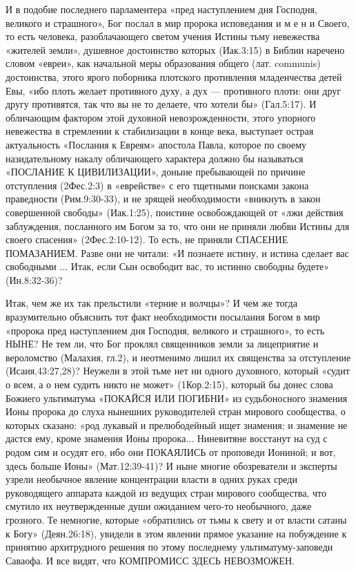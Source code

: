      И в подобие последнего парламентера «пред наступлением дня Господня, великого и страшного», Бог послал в мир пророка исповедания  и м е н и  Своего, то есть человека, разоблачающего светом учения Истины тьму невежества «жителей земли», душевное достоинство которых (Иак.3:15) в Библии наречено словом «евреи», как начальной меры образования общего (лат. communis) достоинства, этого ярого поборника плотского противления младенчества детей Евы, «ибо плоть желает противного духу, а дух --- противного плоти: они друг другу противятся, так что вы не то делаете, что хотели бы» (Гал.5:17).
И обличающим фактором этой духовной невозрожденности, этого упорного невежества в стремлении к стабилизации в конце века, выступает острая актуальность «Послания к Евреям» апостола Павла, которое по своему назидательному накалу обличающего характера должно бы называться «ПОСЛАНИЕ К ЦИВИЛИЗАЦИИ», доныне пребывающей по причине отступления (2Фес.2:3) в «еврействе» с его тщетными поисками закона праведности (Рим.9:30-33), и не зрящей необходимости «вникнуть в закон совершенной свободы» (Иак.1:25), поистине освобождающей от «лжи действия заблуждения, посланного им Богом за то, что они не приняли любви Истины для своего спасения» (2Фес.2:10-12). То есть, не приняли  СПАСЕНИЕ  ПОМАЗАНИЕМ. Разве они не читали: «И познаете истину, и истина сделает вас свободными ... Итак, если Сын освободит вас, то истинно свободны будете» (Ин.8:32-36)?

      Итак, чем же их так прельстили «терние и волчцы»?
      И чем же тогда вразумительно объяснить тот факт необходимости посылания Богом в мир «пророка пред наступлением дня Господня, великого и страшного», то есть НЫНЕ? Не тем ли, что Бог проклял священников земли за лицеприятие и вероломство (Малахия, гл.2), и неотменимо лишил их священства за отступление (Исаия,43:27,28)?     Неужели в этой тьме нет ни одного духовного, который «судит о всем, а о нем судить никто не может» (1Кор.2:15), который бы донес слова Божиего ультиматума  «ПОКАЙСЯ  ИЛИ  ПОГИБНИ»  из судьбоносного знамения Ионы пророка до слуха нынешних руководителей стран мирового сообщества, о которых сказано: «род лукавый и прелюбодейный ищет знамения; и знамение не дастся ему, кроме знамения Ионы пророка... Ниневитяне восстанут на суд с родом сим и осудят его, ибо они  ПОКАЯЛИСЬ  от проповеди Иониной; и вот, здесь больше Ионы» (Мат.12:39-41)?
     И ныне многие обозреватели и эксперты узрели необычное явление концентрации власти в одних руках среди руководящего аппарата каждой из ведущих стран мирового сообщества, что смутило их неутвержденные души ожиданием чего-то необычного, даже грозного. Те немногие, которые «обратились от тьмы к свету и от власти сатаны к Богу» (Деян.26:18), увидели в этом явлении прямое указание на побуждение к принятию архитрудного решения по этому последнему ультиматуму-заповеди Саваофа.
И все видят, что  КОМПРОМИСС  ЗДЕСЬ  НЕВОЗМОЖЕН.

